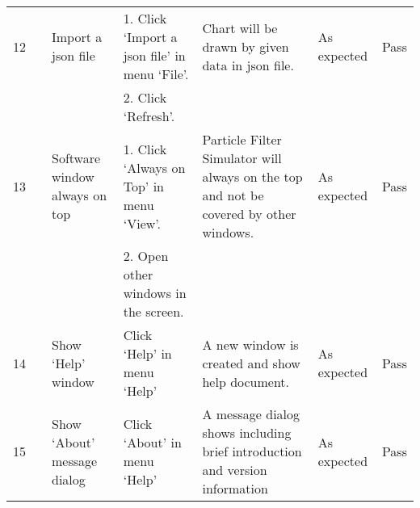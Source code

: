\documentclass{article}
\begin{document}
\begin{longtable}{|p{10pt}|p{60pt}|p{95pt}|p{130pt}|p{60pt}|p{55pt}|p{25pt}|}
{12} &                                       & {Import a json file}                                                                                       & 1.    Click ‘Import a json file’ in menu ‘File’.                                                 & {Chart will be drawn by given data in json file.}                                       & {As expected}                              & {Pass} \\ \cline{4-4}
                    &                                       &                                                                                                                           & 2.    Click ‘Refresh’.                                                                           &                                                                                                        &                                                           &                       \\ \cline{1-1} \cline{3-7}
{13} &                                       & {Software window always on top}                                                                            & 1.    Click ‘Always on Top’ in menu ‘View’.                                                      & {Particle Filter Simulator will always on the top and not be covered by other windows.} & {As expected}                              & {Pass} \\ \cline{4-4}
                    &                                       &                                                                                                                           & 2.    Open other windows in the screen.                                                          &                                                                                                        &                                                           &                       \\ \cline{1-1} \cline{3-7}
14                  &                                       & Show ‘Help’ window                                                                                                        & Click ‘Help’ in menu ‘Help’                                                                      & A new window is created and show help document.                                                        & As expected                                               & Pass                  \\ \cline{1-1} \cline{3-7}
15                  &                                       & Show ‘About’ message dialog                                                                                               & Click ‘About’ in menu ‘Help’                                                                     & A message dialog shows including brief introduction and version information                            & As expected                                               & Pass                  \\ \cline{1-1} \cline{3-7}

\end{longtable}
\end{document}
